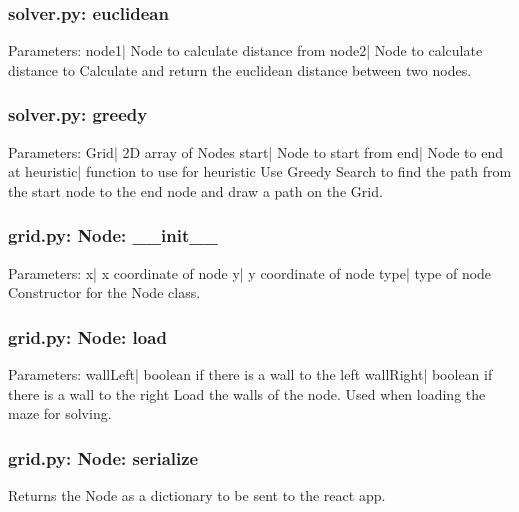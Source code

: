\documentclass[titlepage]{article}
\begin{document}
\subsubsection{solver.py: euclidean}
Parameters:\newline
\indent node1| Node to calculate distance from\newline
\indent node2| Node to calculate distance to\newline
Calculate and return the euclidean distance between two nodes.

\subsubsection{solver.py: greedy}
Parameters:\newline
\indent Grid| 2D array of Nodes\newline
\indent start| Node to start from\newline
\indent end| Node to end at\newline
\indent heuristic| function to use for heuristic\newline
Use Greedy Search to find the path from the start node to the end node and draw a path on the Grid.

\subsubsection{grid.py: Node: \_\_init\_\_}
Parameters:\newline
\indent x| x coordinate of node\newline
\indent y| y coordinate of node\newline
\indent type| type of node\newline
Constructor for the Node class.

\subsubsection{grid.py: Node: load}
Parameters:\newline
\indent wallLeft| boolean if there is a wall to the left\newline
\indent wallRight| boolean if there is a wall to the right\newline
Load the walls of the node. Used when loading the maze for solving.

\subsubsection{grid.py: Node: serialize}
Returns the Node as a dictionary to be sent to the react app.
\end{document}
